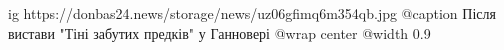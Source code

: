  
 
 
 
 

\ifcmt
  ig https://donbas24.news/storage/news/uz06gfimq6m354qb.jpg
	@caption Після вистави "Тіні забутих предків" у Ганновері
  @wrap center
  @width 0.9
\fi
